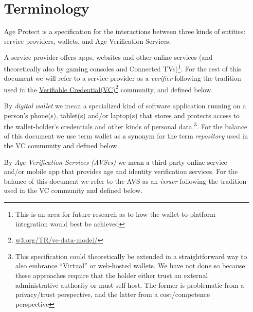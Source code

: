 \documentclass[11pt, oneside]{article}   	%
\newcommand{\hyperfootnote}[1][]{\def\ArgI{{#1}}\hyperfootnoteRelay}
\newcommand\hyperfootnoteRelay[2][]{\href{#1#2}{\ArgI}\footnote{\href{#1#2}{#2}}}
\begin{document}
\section{Terminology}

Age Protect is a specification for the interactions between three kinds of entities: service providers, wallets, and Age Verification Services. 

A service provider offers apps, websites and other online services (and theoretically also by gaming consoles and Connected TVs)\footnote{This is an area for future research as to how the wallet-to-platform integration would best be achieved}. For the rest of this document we will refer to a service provider as a \emph{verifier} following the tradition used in the \hyperfootnote[Verifiable Credential(VC)][https://]{w3.org/TR/vc-data-model/} community, and defined below.

By \emph{digital wallet} we mean a specialized kind of software application running on a person's phone(s), tablet(s) and/or laptop(s) that stores and protects access to the wallet-holder's credentials and other kinds of personal data.\footnote{This specification could theoretically be extended in a straightforward way to also embrance ``Virtual'' or web-hosted wallets. We have not done so because these approaches require that the holder either trust an external administrative authority or must self-host. The former is problematic from a privacy/trust perspective, and the latter from a cost/competence perspective}. For the balance of this document we use term wallet as a synonym for the term \emph{repository} used in the VC community and defined below.

By \emph{Age Verification Services (AVSes)} we mean a third-party online service and/or mobile app that provides age and identity verification services. For the balance of this document we refer to the AVS as an \emph{issuer} following the tradition used in the VC community and defined below.
\end{document}
